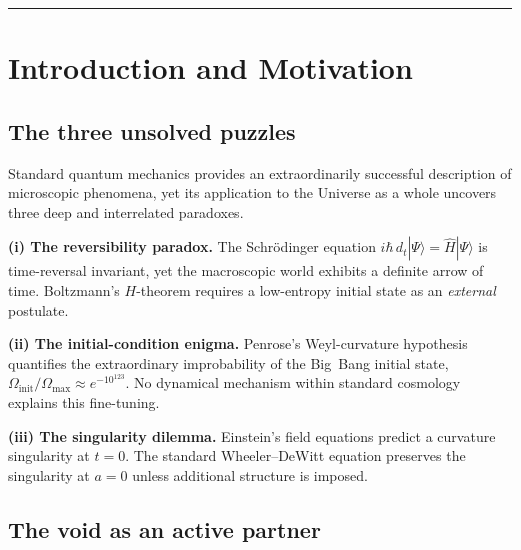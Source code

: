 \documentclass[12pt,a4paper]{article}
\theoremstyle{plain}
\theoremstyle{definition}
\begin{document}
\hrule\bigskip
\tableofcontents
\newpage

\section{Introduction and Motivation}
\label{sec:intro}

\subsection{The three unsolved puzzles}

Standard quantum mechanics provides an extraordinarily successful description
of microscopic phenomena, yet its application to the Universe as a whole
uncovers three deep and interrelated paradoxes.

\medskip

\noindent\textbf{(i) The reversibility paradox.}
The Schr\"odinger equation $i\hbar\,d_t|\Psi\rangle = \hat H|\Psi\rangle$
is time-reversal invariant, yet the macroscopic world exhibits a definite
arrow of time.
Boltzmann's $H$-theorem requires a low-entropy initial state as an
\emph{external} postulate.

\medskip

\noindent\textbf{(ii) The initial-condition enigma.}
Penrose's Weyl-curvature hypothesis \cite{Penrose1979} quantifies the
extraordinary improbability of the Big~Bang initial state,
$\Omega_{\mathrm{init}}/\Omega_{\max}\approx e^{-10^{123}}$.
No dynamical mechanism within standard cosmology explains this fine-tuning.

\medskip

\noindent\textbf{(iii) The singularity dilemma.}
Einstein's field equations predict a curvature singularity at $t=0$.
The standard Wheeler--DeWitt equation \cite{DeWitt1967,Wheeler1968}
preserves the singularity at $a=0$ unless additional structure is imposed.

\subsection{The void as an active partner}
\end{document}
